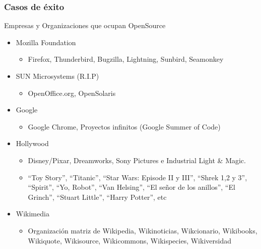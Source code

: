 \frame
{
\frametitle{Casos de éxito}
\Large{Empresas y Organizaciones  que ocupan OpenSource}
\normalsize
\begin{itemize}
	\item Mozilla Foundation
	\begin{itemize}
		\item Firefox, Thunderbird, Bugzilla, Lightning, Sunbird, Seamonkey
	\end{itemize}
	\item SUN Microsystems (R.I.P)
	\begin{itemize}
		\item OpenOffice.org, OpenSolaris
	\end{itemize}
	\item Google
	\begin{itemize}
		\item Google Chrome, Proyectos infinitos (Google Summer of Code)
	\end{itemize}
	\item Hollywood
		\begin{itemize}
			\item Disney/Pixar, Dreamworks, Sony Pictures e Industrial Light \& Magic.
			\item \small{``Toy Story'', ``Titanic'', ``Star Wars: Episode II y III'', ``Shrek 1,2 y 3'', ``Spirit'',
				``Yo, Robot'', ``Van Helsing'', ``El señor de los anillos'', ``El Grinch'', ``Stuart Little'',
				``Harry Potter'', etc}
		\end{itemize}
	\normalsize
	\item Wikimedia
	\begin{itemize}
		\item \small{Organización matriz de Wikipedia, Wikinoticias, Wikcionario, Wikibooks, Wikiquote, Wikisource,
			Wikicommons, Wikispecies, Wikiversidad}
	\end{itemize}
\end{itemize}
}

